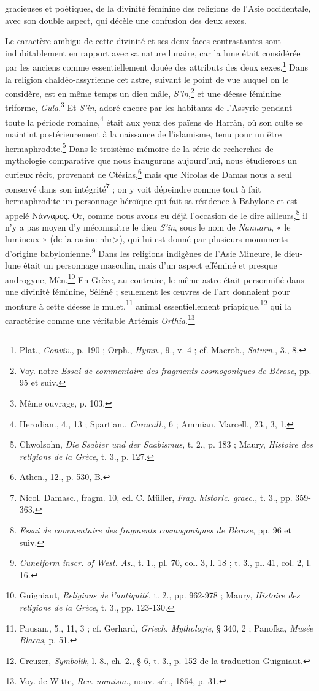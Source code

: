 \documentclass[a4paper, 11pt, oneside, landscape]{article}
\begin{document}
gracieuses et poétiques, de la divinité féminine des religions de l'Asie occidentale, avec son double aspect, qui décèle une confusion des deux sexes.

Le caractère ambigu de cette divinité et ses deux faces contrastantes sont indubitablement en rapport avec sa nature lunaire, car la lune était considérée par les anciens comme essentiellement douée des attributs des deux sexes.\footnote{Plat., \emph{Conviv.}, p. 190 ; Orph., \emph{Hymn.}, 9., v. 4 ; cf. Macrob., \emph{Saturn.}, 3., 8.} Dans la religion chaldéo-assyrienne cet astre, suivant le point de vue auquel on le considère, est en même temps un dieu mâle, \emph{S'in},\footnote{Voy. notre \emph{Essai de commentaire des fragments cosmogoniques de Bérose}, pp. 95 et suiv.} et une déesse féminine triforme, \emph{Gula}.\footnote{Même ouvrage, p. 103.} Et \emph{S'in}, adoré encore par les habitants de l'Assyrie pendant toute la période romaine,\footnote{Herodian., 4., 13 ; Spartian., \emph{Caracall.}, 6 ; Ammian. Marcell., 23., 3, 1.} était aux yeux des païens de Harrân, où son culte se maintint postérieurement à la naissance de l'islamisme, tenu pour un être hermaphrodite.\footnote{Chwolsohn, \emph{Die Ssabier und der Saabismus}, t. 2., p. 183 ; Maury, \emph{Histoire des religions de la Grèce}, t. 3., p. 127.} Dans le troisième mémoire de la série de recherches de mythologie comparative que nous inaugurons aujourd'hui, nous étudierons un curieux récit, provenant de Ctésias,\footnote{Athen., 12., p. 530, B.} mais que Nicolas de Damas nous a seul conservé dans son intégrité\footnote{Nicol. Damasc., fragm. 10, ed. C. Müller, \emph{Frag. historic. graec.}, t. 3., pp. 359-363.} ; on y voit dépeindre comme tout à fait hermaphrodite un personnage héroïque qui fait sa résidence à Babylone et est appelé Νἁνναρος. Or, comme nous avons eu déjà l'occasion de le dire ailleurs,\footnote{\emph{Essai de commentaire des fragments cosmogoniques de Bèrose}, pp. 96 et suiv.} il n'y a pas moyen d'y méconnaître le dieu \emph{S'in}, sous le nom de \emph{Nannaru}, « le lumineux » (de la racine \<nhr>), qui lui est donné par plusieurs monuments d'origine babylonienne.\footnote{\emph{Cuneiform inscr. of West. As.}, t. 1., pl. 70, col. 3, l. 18 ; t. 3., pl. 41, col. 2, l. 16.} Dans les religions indigènes de l'Asie Mineure, le dieu-lune était un personnage masculin, mais d'un aspect efféminé et presque androgyne, Mên.\footnote{Guigniaut, \emph{Religions de l'antiquité}, t. 2., pp. 962-978 ; Maury, \emph{Histoire des religions de la Grèce}, t. 3., pp. 123-130.} En Grèce, au contraire, le même astre était personnifié dans une divinité féminine, Séléné ; seulement les œuvres de l'art donnaient pour monture à cette déesse le mulet,\footnote{Pausan., 5., 11, 3 ; cf. Gerhard, \emph{Griech. Mythologie}, § 340, 2 ; Panofka, \emph{Musée Blacas}, p. 51.} animal essentiellement priapique,\footnote{Creuzer, \emph{Symbolik}, l. 8., ch. 2., § 6, t. 3., p. 152 de la traduction Guigniaut.} qui la caractérise comme une véritable Artémis \emph{Orthia}.\footnote{Voy. de Witte, \emph{Rev. numism.}, nouv. sér., 1864, p. 31.}
\end{document}
